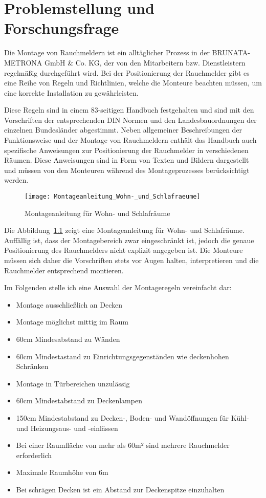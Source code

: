 \chapter{Problemstellung und Forschungsfrage}

Die Montage von Rauchmeldern ist ein alltäglicher Prozess in der BRUNATA-METRONA GmbH \& Co. KG, der von den Mitarbeitern bzw. Dienstleistern regelmäßig durchgeführt wird. Bei der Positionierung der Rauchmelder gibt es eine Reihe von Regeln und Richtlinien, welche die Monteure beachten müssen, um eine korrekte Installation zu gewährleisten. 

Diese Regeln sind in einem 83-seitigen Handbuch festgehalten und sind mit den Vorschriften der entsprechenden DIN Normen und den Landesbauordnungen der einzelnen Bundesländer abgestimmt. Neben allgemeiner Beschreibungen der Funktionsweise und der Montage von Rauchmeldern enthält das Handbuch auch spezifische Anweisungen zur Positionierung der Rauchmelder in verschiedenen Räumen. Diese Anweisungen sind in Form von Texten und Bildern dargestellt und müssen von den Monteuren während des Montageprozesses berücksichtigt werden.


\begin{figure}
\centering
\texttt{[image: Montageanleitung\_Wohn-\_und\_Schlafraeume]}
\caption{Montageanleitung für Wohn- und Schlafräume\label{fig:Anleitung}}\par
\end{figure}

Die Abbildung~\ref{fig:Anleitung} zeigt eine Montageanleitung für Wohn- und Schlafräume. Auffällig ist, dass der Montagebereich zwar eingeschränkt ist, jedoch die genaue Positionierung des Rauchmelders nicht explizit angegeben ist. Die Monteure müssen sich daher die Vorschriften stets vor Augen halten, interpretieren und die Rauchmelder entsprechend montieren. 

Im Folgenden stelle ich eine Auswahl der Montageregeln vereinfacht dar:

\begin{itemize}
    \item Montage ausschließlich an Decken
    \item Montage möglichst mittig im Raum
    \item 60cm Mindesabstand zu Wänden
    \item 60cm Mindestastand zu Einrichtungsgegenständen wie deckenhohen Schränken
    \item Montage in Türbereichen unzulässig
    \item 60cm Mindestabstand zu Deckenlampen
    \item 150cm Mindestabstand zu Decken-, Boden- und Wandöffnungen für Kühl- und Heizungsaus- und -einlässen 
    \item Bei einer Raumfläche von mehr als 60m² sind mehrere Rauchmelder erforderlich
    \item Maximale Raumhöhe von 6m
    \item Bei schrägen Decken ist ein Abstand zur Deckenspitze einzuhalten
\end{itemize}


